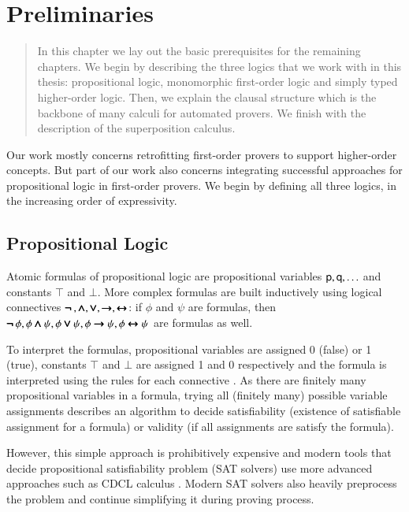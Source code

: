 \chapter{Preliminaries}
\label{ch:pre}

\begin{abstract}
    In this chapter we lay out the basic prerequisites for the remaining
    chapters. We begin by describing the three logics that we work with in this
    thesis: propositional logic, monomorphic first-order logic and simply typed
    higher-order logic. Then, we explain the clausal structure which is the
    backbone of many calculi for automated provers. We finish with the description of the
    superposition calculus.
\end{abstract}
      
\newpage

Our work mostly concerns retrofitting first-order provers to support
higher-order concepts. But part of our work also concerns integrating
successful approaches for propositional logic in first-order
provers. We begin by defining all three logics, in the increasing
order of expressivity.

\section{Propositional Logic}

Atomic formulas of propositional logic are propositional variables
$\mathsf{p}, \mathsf{q}, \ldots$ and constants $\top$ and $\bot$. More complex
formulas are built inductively using logical connectives $\pmb{\neg\,}, \pmb\land, \pmb\lor,
\pmb\rightarrow, \allowbreak \pmb\leftrightarrow$: if $\phi$ and $\psi$ are formulas, then $\pmb{\neg\,} \phi, \phi \pmb\land
\psi, \allowbreak \phi \pmb\lor \psi, \phi \pmb\rightarrow \psi, \phi \pmb\leftrightarrow \psi$ are formulas as well.

To interpret the formulas, propositional variables are assigned 0 (false) or 1
(true), constants $\top$ and $\bot$ are assigned 1 and 0 respectively and the
formula is interpreted using the rules for each connective
\cite[Sect.~1.4]{hr-00-logic-in-cs}. As there are finitely many propositional
variables in a formula, trying all (finitely many) possible variable assignments
describes an algorithm to decide satisfiability (existence of satisfiable
assignment for a formula) or validity (if all assignments are satisfy the formula).

However, this simple approach is prohibitively expensive and modern tools that
decide propositional satisfiability problem (SAT solvers) use more advanced
approaches such as CDCL calculus \cite{mss-96-cdcl}. Modern SAT solvers also
heavily preprocess the problem and continue simplifying it during proving
process.

